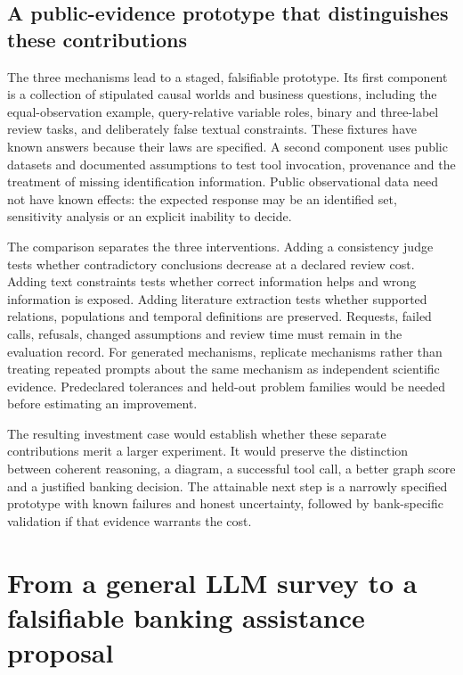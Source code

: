 \subsection{A public-evidence prototype that distinguishes these contributions}

The three mechanisms lead to a staged, falsifiable prototype. Its first
component is a collection of stipulated causal worlds and business questions,
including the equal-observation example, query-relative variable roles,
binary and three-label review tasks, and deliberately false textual
constraints. These fixtures have known answers because their laws are
specified. A second component uses public datasets and documented assumptions
to test tool invocation, provenance and the treatment of missing identification
information. Public observational data need not have known effects: the
expected response may be an identified set, sensitivity analysis or an
explicit inability to decide.

The comparison separates the three interventions. Adding a consistency judge
tests whether contradictory conclusions decrease at a declared review cost.
Adding text constraints tests whether correct information helps and wrong
information is exposed. Adding literature extraction tests whether supported
relations, populations and temporal definitions are preserved. Requests,
failed calls, refusals, changed assumptions and review time must remain in
the evaluation record. For generated mechanisms, replicate mechanisms rather
than treating repeated prompts about the same mechanism as independent
scientific evidence. Predeclared tolerances and held-out problem families
would be needed before estimating an improvement.

The resulting investment case would establish whether these separate
contributions merit a larger experiment. It would preserve the distinction
between coherent reasoning, a diagram, a successful tool call, a better
graph score and a justified banking decision. The attainable next step is
a narrowly specified prototype with known failures and honest uncertainty,
followed by bank-specific validation if that evidence warrants the cost.
\label{exec17:frontier-end}


\section{From a general LLM survey to a falsifiable banking assistance proposal}
\label{sec:exec24-llm-challenges}


